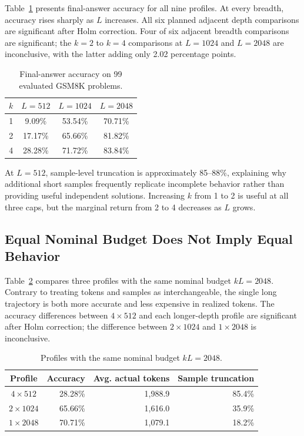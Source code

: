\documentclass[runningheads]{llncs}
\begin{document}
Table~\ref{tab:grid} presents final-answer accuracy for all nine profiles. At
every breadth, accuracy rises sharply as $L$ increases. All six planned adjacent
depth comparisons are significant after Holm correction. Four of six adjacent
breadth comparisons are significant; the $k=2$ to $k=4$ comparisons at
$L=1024$ and $L=2048$ are inconclusive, with the latter adding only 2.02
percentage points.

\begin{table}
\caption{Final-answer accuracy on 99 evaluated GSM8K problems.}
\label{tab:grid}
\centering
\begin{tabular}{c|ccc}
\hline
$k$ & $L=512$ & $L=1024$ & $L=2048$ \\
\hline
1 & 9.09\% & 53.54\% & 70.71\% \\
2 & 17.17\% & 65.66\% & 81.82\% \\
4 & 28.28\% & 71.72\% & 83.84\% \\
\hline
\end{tabular}
\end{table}

At $L=512$, sample-level truncation is approximately 85--88\%, explaining why
additional short samples frequently replicate incomplete behavior rather than
providing useful independent solutions. Increasing $k$ from 1 to 2 is useful
at all three caps, but the marginal return from 2 to 4 decreases as $L$ grows.

\subsection{Equal Nominal Budget Does Not Imply Equal Behavior}

Table~\ref{tab:isobudget} compares three profiles with the same nominal budget
$kL=2048$. Contrary to treating tokens and samples as interchangeable, the
single long trajectory is both more accurate and less expensive in realized
tokens. The accuracy differences between $4\times512$ and each longer-depth
profile are significant after Holm correction; the difference between
$2\times1024$ and $1\times2048$ is inconclusive.

\begin{table}
\caption{Profiles with the same nominal budget $kL=2048$.}
\label{tab:isobudget}
\centering
\begin{tabular}{c|r|r|r}
\hline
Profile & Accuracy & Avg. actual tokens & Sample truncation \\
\hline
$4\times512$ & 28.28\% & 1,988.9 & 85.4\% \\
$2\times1024$ & 65.66\% & 1,616.0 & 35.9\% \\
$1\times2048$ & 70.71\% & 1,079.1 & 18.2\% \\
\hline
\end{tabular}
\end{table}
\end{document}
